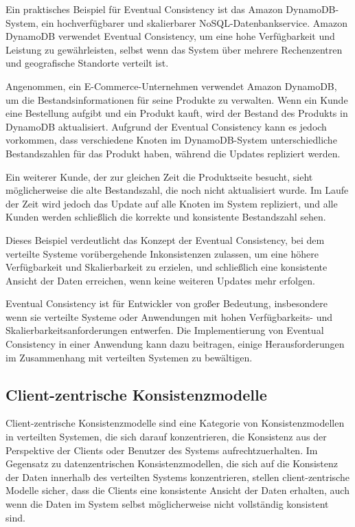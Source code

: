 \documentclass[../vs-script-first-v01.tex]{subfiles}
\begin{document}
Ein praktisches Beispiel für Eventual Consistency ist das Amazon DynamoDB-System, ein hochverfügbarer und skalierbarer NoSQL-Datenbankservice. Amazon DynamoDB verwendet Eventual Consistency, um eine hohe Verfügbarkeit und Leistung zu gewährleisten, selbst wenn das System über mehrere Rechenzentren und geografische Standorte verteilt ist.

Angenommen, ein E-Commerce-Unternehmen verwendet Amazon DynamoDB, um die Bestandsinformationen für seine Produkte zu verwalten. Wenn ein Kunde eine Bestellung aufgibt und ein Produkt kauft, wird der Bestand des Produkts in DynamoDB aktualisiert. Aufgrund der Eventual Consistency kann es jedoch vorkommen, dass verschiedene Knoten im DynamoDB-System unterschiedliche Bestandszahlen für das Produkt haben, während die Updates repliziert werden.

Ein weiterer Kunde, der zur gleichen Zeit die Produktseite besucht, sieht möglicherweise die alte Bestandszahl, die noch nicht aktualisiert wurde. Im Laufe der Zeit wird jedoch das Update auf alle Knoten im System repliziert, und alle Kunden werden schließlich die korrekte und konsistente Bestandszahl sehen.

Dieses Beispiel verdeutlicht das Konzept der Eventual Consistency, bei dem verteilte Systeme vorübergehende Inkonsistenzen zulassen, um eine höhere Verfügbarkeit und Skalierbarkeit zu erzielen, und schließlich eine konsistente Ansicht der Daten erreichen, wenn keine weiteren Updates mehr erfolgen.

Eventual Consistency ist für Entwickler von großer Bedeutung, insbesondere wenn sie verteilte Systeme oder Anwendungen mit hohen Verfügbarkeits- und Skalierbarkeitsanforderungen entwerfen. Die Implementierung von Eventual Consistency in einer Anwendung kann dazu beitragen, einige Herausforderungen im Zusammenhang mit verteilten Systemen zu bewältigen.


\subsection{Client-zentrische Konsistenzmodelle}
Client-zentrische Konsistenzmodelle sind eine Kategorie von Konsistenzmodellen in verteilten Systemen, die sich darauf konzentrieren, die Konsistenz aus der Perspektive der Clients oder Benutzer des Systems aufrechtzuerhalten. Im Gegensatz zu datenzentrischen Konsistenzmodellen, die sich auf die Konsistenz der Daten innerhalb des verteilten Systems konzentrieren, stellen client-zentrische Modelle sicher, dass die Clients eine konsistente Ansicht der Daten erhalten, auch wenn die Daten im System selbst möglicherweise nicht vollständig konsistent sind.
\end{document}

